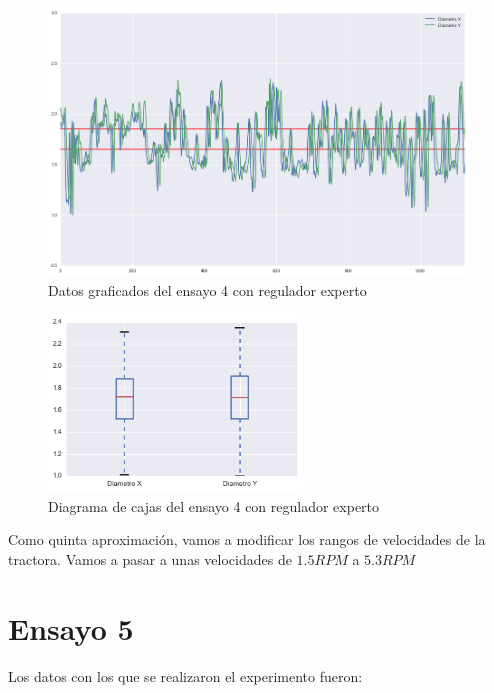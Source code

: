 \begin{figure}[H]
    \centering
    \includegraphics[width=0.99\textwidth]{images/producciones/13082015/output_9_e1.png}
    \caption{Datos graficados del ensayo 4 con regulador experto}
    \label{fig:reg_graf4}
\end{figure}

\begin{figure}[H]
    \centering
    \includegraphics[width=0.6\textwidth]{images/producciones/13082015/output_10_e1.png}
    \caption{Diagrama de cajas del ensayo 4 con regulador experto}
    \label{fig:reg_cajas4}
\end{figure}

Como quinta  aproximación, vamos a  modificar los rangos de velocidades de la tractora. Vamos a pasar a unas velocidades de $1.5RPM$ a $5.3RPM$ \\

\section{Ensayo 5}

Los datos con los que se realizaron el experimento fueron:

